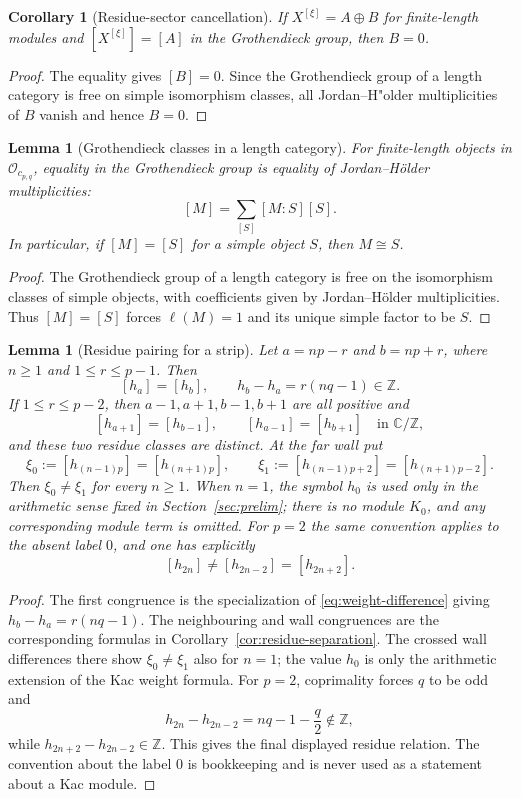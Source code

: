 \documentclass[12pt,leqno]{amsart}
\numberwithin{equation}{section}
\newtheorem{lem}[thm]{Lemma}
\newtheorem{cor}[thm]{Corollary}
\newcommand{\Oc}{\mathcal O}
\def\Z{\mathbb{Z}}
\def\C{\mathbb{C}}
\begin{document}
\begin{cor}[Residue-sector cancellation]
\label{cor:residue-sector-cancellation}
If $X^{[\xi]}=A\oplus B$ for finite-length modules and
$[X^{[\xi]}]=[A]$ in the Grothendieck group, then $B=0$.
\end{cor}

\begin{proof}
The equality gives $[B]=0$.  Since the Grothendieck group of a length
category is free on simple isomorphism classes, all Jordan--H"older
multiplicities of $B$ vanish and hence $B=0$.
\end{proof}

\begin{lem}[Grothendieck classes in a length category]
\label{lem:length-K0}
For finite-length objects in $\Oc_{c_{p,q}}$, equality in the
Grothendieck group is equality of Jordan--H\"older multiplicities:
\[
 [M]=\sum_{[S]}[M:S][S].
\]
In particular, if $[M]=[S]$ for a simple object $S$, then $M\cong S$.
\end{lem}

\begin{proof}
The Grothendieck group of a length category is free on the isomorphism
classes of simple objects, with coefficients given by Jordan--H\"older
multiplicities.  Thus $[M]=[S]$ forces $\ell(M)=1$ and its unique simple
factor to be $S$.
\end{proof}

\begin{lem}[Residue pairing for a strip]\label{lem:strip-residue-pairing}
Let $a=np-r$ and $b=np+r$, where $n\ge1$ and $1\le r\le p-1$.  Then
\[
 [h_a]=[h_b],
 \qquad h_b-h_a=r(nq-1)\in\Z.
\]
If $1\le r\le p-2$, then $a-1,a+1,b-1,b+1$ are all positive and
\[
 [h_{a+1}]=[h_{b-1}],\qquad
 [h_{a-1}]=[h_{b+1}]
 \quad\text{in }\C/\Z,
\]
and these two residue classes are distinct.  At the far wall put
\[
 \xi_0:=[h_{(n-1)p}]=[h_{(n+1)p}],\qquad
 \xi_1:=[h_{(n-1)p+2}]=[h_{(n+1)p-2}].
\]
Then $\xi_0\ne\xi_1$ for every $n\ge1$.  When $n=1$, the symbol $h_0$
is used only in the arithmetic sense fixed in Section~\ref{sec:prelim};
there is no module $K_0$, and any corresponding module term is omitted.
For $p=2$ the same convention applies to the absent label $0$, and one
has explicitly
\[
 [h_{2n}]\ne[h_{2n-2}]=[h_{2n+2}].
\]
\end{lem}

\begin{proof}
The first congruence is the specialization of
\eqref{eq:weight-difference} giving $h_b-h_a=r(nq-1)$.  The neighbouring and wall congruences are the corresponding formulas in
Corollary~\ref{cor:residue-separation}.  The crossed wall differences there
show $\xi_0\ne\xi_1$ also for $n=1$; the value $h_0$ is only the arithmetic
extension of the Kac weight formula.  For $p=2$, coprimality forces $q$ to
be odd and
\[
 h_{2n}-h_{2n-2}=nq-1-\frac q2\notin\Z,
\]
while $h_{2n+2}-h_{2n-2}\in\Z$.  This gives the final displayed residue
relation.  The convention about the label $0$ is bookkeeping and is never
used as a statement about a Kac module.
\end{proof}
\end{document}
